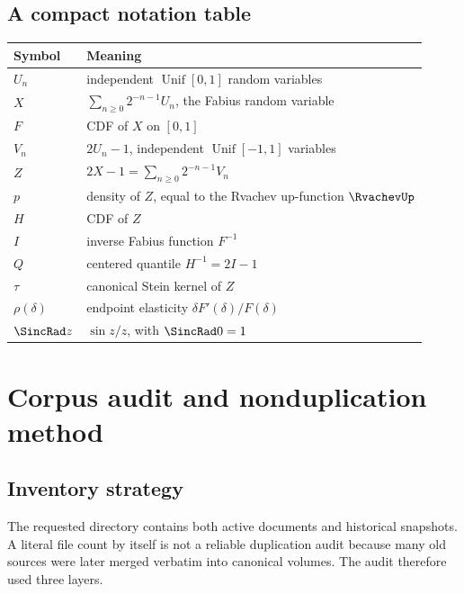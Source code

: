 \documentclass[11pt,oneside]{article}
\theoremstyle{definition}
\theoremstyle{remark}
\begin{document}
\subsection{A compact notation table}
\begin{center}
\begin{tabularx}{0.94\textwidth}{l X}
\toprule
Symbol & Meaning\\
\midrule
$U_n$ & independent $\operatorname{Unif}[0,1]$ random variables\\
$X$ & $\sum_{n\ge0}2^{-n-1}U_n$, the Fabius random variable\\
$F$ & CDF of $X$ on $[0,1]$\\
$V_n$ & $2U_n-1$, independent $\operatorname{Unif}[-1,1]$ variables\\
$Z$ & $2X-1=\sum_{n\ge0}2^{-n-1}V_n$\\
$p$ & density of $Z$, equal to the Rvachev up-function $\RvachevUp$\\
$H$ & CDF of $Z$\\
$I$ & inverse Fabius function $F^{-1}$\\
$Q$ & centered quantile $H^{-1}=2I-1$\\
$\tau$ & canonical Stein kernel of $Z$\\
$\rho(\delta)$ & endpoint elasticity $\delta F'(\delta)/F(\delta)$\\
$\SincRad z$ & $\sin z/z$, with $\SincRad 0=1$\\
\bottomrule
\end{tabularx}
\end{center}

\section{Corpus audit and nonduplication method}

\subsection{Inventory strategy}
The requested directory contains both active documents and historical snapshots.
A literal file count by itself is not a reliable duplication audit because many
old sources were later merged verbatim into canonical volumes.  The audit therefore
used three layers.
\end{document}
